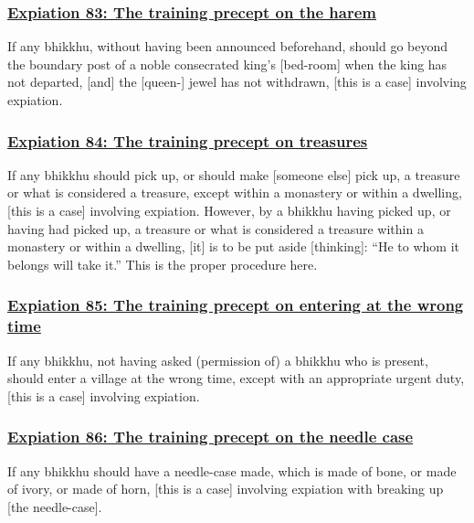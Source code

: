 \subsubsection*{\hyperref[pac83]{Expiation 83: The training precept on the harem}}
\label{exp83}
If any bhikkhu, without having been announced beforehand, should go beyond the boundary post of a noble consecrated king's [bed-room] when the king has not departed, [and] the [queen-] jewel has not withdrawn, [this is a case] involving expiation.



\subsubsection*{\hyperref[pac84]{Expiation 84: The training precept on treasures}}
\label{exp84}
If any bhikkhu should pick up, or should make [someone else] pick up, a treasure or what is considered a treasure, except within a monastery or within a dwelling, [this is a case] involving expiation. However, by a bhikkhu having picked up, or having had picked up, a treasure or what is considered a treasure within a monastery or within a dwelling, [it] is to be put aside [thinking]: ``He to whom it belongs will take it.'' This is the proper procedure here.



\subsubsection*{\hyperref[pac85]{Expiation 85: The training precept on entering at the wrong time}}
\label{exp85}
If any bhikkhu, not having asked (permission of) a bhikkhu who is present, should enter a village at the wrong time, except with an appropriate urgent duty, [this is a case] involving expiation.



\subsubsection*{\hyperref[pac86]{Expiation 86: The training precept on the needle case}}
\label{exp86}
If any bhikkhu should have a needle-case made, which is made of bone, or made of ivory, or made of horn, [this is a case] involving expiation with breaking up [the needle-case].



